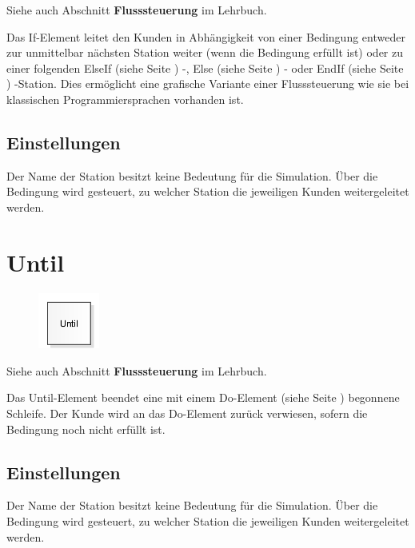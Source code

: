 Siehe auch Abschnitt \textbf{Flusssteuerung} im Lehrbuch.

Das If-Element leitet den Kunden in Abhängigkeit von einer Bedingung entweder
zur unmittelbar nächsten Station weiter (wenn die Bedingung erfüllt ist) oder
zu einer folgenden ElseIf (siehe Seite \pageref{ref:ModelElementLogicElseIf}) -,
Else (siehe Seite \pageref{ref:ModelElementLogicElse}) - oder
EndIf (siehe Seite \pageref{ref:ModelElementLogicEndIf}) -Station.
Dies ermöglicht eine grafische Variante einer Flusssteuerung wie sie bei
klassischen Programmiersprachen vorhanden ist.

\subsection*{Einstellungen}

Der Name der Station besitzt keine Bedeutung für die Simulation. Über die Bedingung
wird gesteuert, zu welcher Station die jeweiligen Kunden weitergeleitet werden.


\section{Until}
\label{ref:ModelElementLogicUntil}

\begin{figure}
\vspace{-22pt}
\includegraphics[width=2cm]{imageModelElementLogicUntil.png}
\vspace{-22pt}
\end{figure}

Siehe auch Abschnitt \textbf{Flusssteuerung} im Lehrbuch.

Das Until-Element beendet eine mit einem
Do-Element (siehe Seite \pageref{ref:ModelElementLogicDo}) begonnene
Schleife. Der Kunde wird an das Do-Element zurück verwiesen,
sofern die Bedingung noch nicht erfüllt ist.

\subsection*{Einstellungen}

Der Name der Station besitzt keine Bedeutung für die Simulation.
Über die Bedingung wird gesteuert, zu welcher Station die jeweiligen Kunden weitergeleitet werden.



